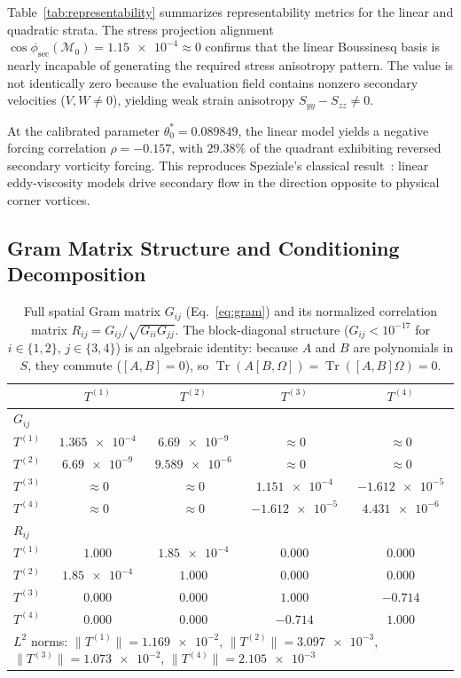 \documentclass[preprint,aps,prb,longbibliography,superscriptaddress]{revtex4-2}
\newcommand{\Tr}{\operatorname{Tr}}
\begin{document}
Table~\ref{tab:representability} summarizes representability metrics for the
linear and quadratic strata. The stress projection alignment
$\cos\phi_{\mathrm{sec}}(\mathcal{M}_0) = \num{1.15e-4} \approx 0$ confirms
that the linear Boussinesq basis is nearly incapable of generating the required
stress anisotropy pattern. The value is not identically zero because the
evaluation field contains nonzero secondary velocities ($V,W \neq 0$), yielding
weak strain anisotropy $S_{yy} - S_{zz} \neq 0$.

At the calibrated parameter $\theta_0^* = 0.089849$, the linear model yields a
negative forcing correlation $\rho = -0.157$, with $29.38\%$ of the quadrant
exhibiting reversed secondary vorticity forcing. This reproduces Speziale's
classical result~\cite{Speziale1987}: linear eddy-viscosity models drive
secondary flow in the direction opposite to physical corner vortices.

\subsection{Gram Matrix Structure and Conditioning Decomposition}
\label{sec:gram_results}

\begin{table}[t]
\caption{Full spatial Gram matrix $G_{ij}$ (Eq.~\ref{eq:gram}) and its
  normalized correlation matrix $R_{ij} = G_{ij}/\sqrt{G_{ii}G_{jj}}$.
  The block-diagonal structure ($G_{ij} < 10^{-17}$ for $i \in \{1,2\}$,
  $j \in \{3,4\}$) is an algebraic identity: because $A$ and $B$ are polynomials
  in $S$, they commute ($[A,B] = 0$), so $\Tr(A[B,\Omega]) = \Tr([A,B]\Omega) = 0$.}\label{tab:gram}
\begin{ruledtabular}
\begin{tabular}{lcccc}
  & $T^{(1)}$ & $T^{(2)}$ & $T^{(3)}$ & $T^{(4)}$ \\
  \midrule
  $G_{ij}$ \\[2pt]
  $T^{(1)}$ & $\num{1.365e-4}$ & $\num{6.69e-9}$ & $\approx 0$ & $\approx 0$ \\
  $T^{(2)}$ & $\num{6.69e-9}$ & $\num{9.589e-6}$ & $\approx 0$ & $\approx 0$ \\
  $T^{(3)}$ & $\approx 0$ & $\approx 0$ & $\num{1.151e-4}$ & $\num{-1.612e-5}$ \\
  $T^{(4)}$ & $\approx 0$ & $\approx 0$ & $\num{-1.612e-5}$ & $\num{4.431e-6}$ \\
  \midrule
  $R_{ij}$ \\[2pt]
  $T^{(1)}$ & $1.000$ & $\num{1.85e-4}$ & $0.000$ & $0.000$ \\
  $T^{(2)}$ & $\num{1.85e-4}$ & $1.000$ & $0.000$ & $0.000$ \\
  $T^{(3)}$ & $0.000$ & $0.000$ & $1.000$ & $-0.714$ \\
  $T^{(4)}$ & $0.000$ & $0.000$ & $-0.714$ & $1.000$ \\
  \midrule
  \multicolumn{5}{l}{$L^2$ norms:
    $\|T^{(1)}\| = \num{1.169e-2}$,
    $\|T^{(2)}\| = \num{3.097e-3}$,
    $\|T^{(3)}\| = \num{1.073e-2}$,
    $\|T^{(4)}\| = \num{2.105e-3}$} \\
\end{tabular}
\end{ruledtabular}
\end{table}
\end{document}
